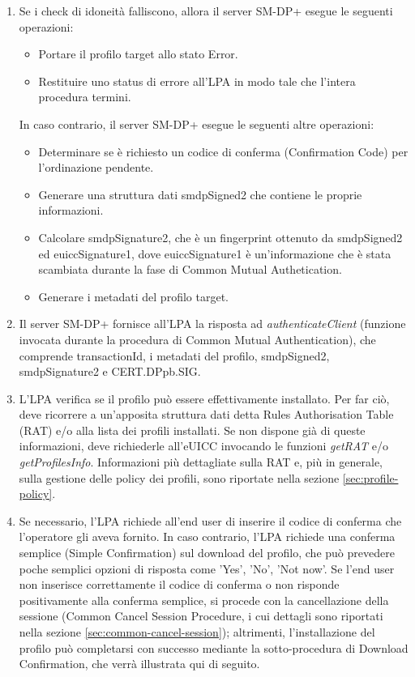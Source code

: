 \documentclass[10pt, oneside]{book}
\begin{document}
\begin{enumerate}
\item Se i check di idoneità falliscono, allora il server SM-DP+ esegue le seguenti operazioni:
\begin{itemize}[itemsep=0pt]
\item Portare il profilo target allo stato Error.
\item Restituire uno status di errore all'LPA in modo tale che l'intera procedura termini.
\end{itemize}
In caso contrario, il server SM-DP+ esegue le seguenti altre operazioni:
\begin{itemize}[itemsep=0pt]
\item Determinare se è richiesto un codice di conferma (Confirmation Code) per l'ordinazione pendente.
\item Generare una struttura dati smdpSigned2 che contiene le proprie informazioni.
\item Calcolare smdpSignature2, che è un fingerprint ottenuto da smdpSigned2 ed euiccSignature1, dove euiccSignature1 è un'informazione che è stata scambiata durante la fase di Common Mutual Authetication.
\item Generare i metadati del profilo target.
\end{itemize}
\item Il server SM-DP+ fornisce all'LPA la risposta ad \textit{authenticateClient} (funzione invocata durante la procedura di Common Mutual Authentication), che comprende transactionId, i metadati del profilo, smdpSigned2, smdpSignature2 e CERT.DPpb.SIG.
\item L'LPA verifica se il profilo può essere effettivamente installato. Per far ciò, deve ricorrere a un'apposita struttura dati detta Rules Authorisation Table (RAT) e/o alla lista dei profili installati. Se non dispone già di queste informazioni, deve richiederle all'eUICC invocando le funzioni \textit{getRAT} e/o \textit{getProfilesInfo}. Informazioni più dettagliate sulla RAT e, più in generale, sulla gestione delle policy dei profili, sono riportate nella sezione \ref{sec:profile-policy}.
\item Se necessario, l'LPA richiede all'end user di inserire il codice di conferma che l'operatore gli aveva fornito. In caso contrario, l'LPA richiede una conferma semplice (Simple Confirmation) sul download del profilo, che può prevedere poche semplici opzioni di risposta come 'Yes', 'No', 'Not now'. Se l'end user non inserisce correttamente il codice di conferma o non risponde positivamente alla conferma semplice, si procede con la cancellazione della sessione (Common Cancel Session Procedure, i cui dettagli sono riportati nella sezione \ref{sec:common-cancel-session}); altrimenti, l'installazione del profilo può completarsi con successo mediante la sotto-procedura di Download Confirmation, che verrà illustrata qui di seguito.
\end{enumerate}
\end{document}
